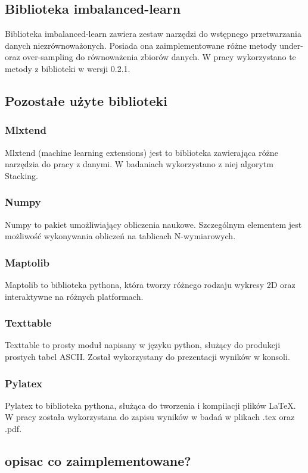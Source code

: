 \subsection{Biblioteka imbalanced-learn}
Biblioteka imbalanced-learn\cite{imlearn} zawiera zestaw narzędzi do wstępnego przetwarzania danych niezrównoważonych. Posiada ona zaimplementowane różne metody under- oraz over-sampling do równoważenia zbiorów danych. W pracy wykorzystano te metody z biblioteki w wersji 0.2.1. 
\subsection{Pozostałe użyte biblioteki}
\subsubsection{Mlxtend}
Mlxtend (machine learning extensions)\cite{mlxtend} jest to biblioteka zawierająca różne narzędzia do pracy z danymi. W badaniach wykorzystano z niej algorytm Stacking.
\subsubsection{Numpy}
Numpy to pakiet umożliwiający obliczenia naukowe. Szczególnym elementem jest możliwość wykonywania obliczeń na tablicach N-wymiarowych. 
\subsubsection{Maptolib}
Maptolib to biblioteka pythona, która tworzy różnego rodzaju wykresy 2D oraz interaktywne na różnych platformach.
\subsubsection{Texttable}
Texttable to prosty moduł napisany w języku python, służący do produkcji prostych tabel ASCII. Został wykorzystany do prezentacji wyników w konsoli.
\subsubsection{Pylatex}
Pylatex to biblioteka pythona, służąca do tworzenia i kompilacji plików LaTeX. W pracy została wykorzystana do zapisu wyników w badań w plikach .tex oraz .pdf.
\subsection{opisac co zaimplementowane?}

